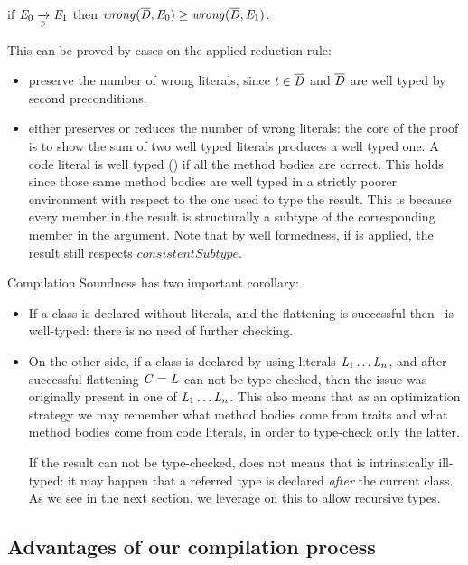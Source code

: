 \begin{Theorem}

if $\mE_0 \xrightarrow[\smallDs]{} \mE_1$
then $\mathit{wrong}(\overline{\mathit{D}},\mathit{E}_0)\geq\mathit{wrong}(\overline{\mathit{D}},\mathit{E}_1)$.
\end{Theorem}
This can be proved by cases on the applied reduction rule:
\begin{itemize}
\item
{} preserve the number of wrong literals,
since $t \in \overline{\mathit{D}}$ and $\overline{\mathit{D}}$ are well typed by  second preconditions.
\item {} either preserves or reduces the number of
wrong literals:
the core of the proof is to show the sum of two well typed literals produces a well typed one.
A code literal is well typed () if all the method bodies are correct.
This holds since those same method bodies
are well typed in a strictly poorer environment with respect to the one used to type the result.
This is because every member in the result
is structurally a subtype of
the corresponding member in the argument.
Note that by well formedness, if 
is applied, the result still respects 
$\mathit{consistentSubtype}$.
\end{itemize}
\noindent 
Compilation Soundness has two important corollary:
\begin{itemize}
\item If a class is declared without literals,
and the flattening is successful then \mC\ is well-typed: there is no need of further checking.
\item On the other side, if a class is declared by using literals $\mathit{L}_1\ldots\mathit{L}_n$, and after successful flattening $\mathit{C} = \mathit{L}$ can not be type-checked,
then the issue was originally present in one of $\mathit{L}_1\ldots\mathit{L}_n$.
This also means that as an optimization strategy
 we may remember what method bodies come from traits and what method bodies come from code literals, in order to type-check only the latter.

If the result can not be type-checked, does not means
that is intrinsically ill-typed: it may happen that a 
referred type is declared \emph{after} the current class. 
As we see in the next section, we leverage on this 
to allow recursive types.
 \end{itemize}






\subsection{Advantages of our compilation process}


